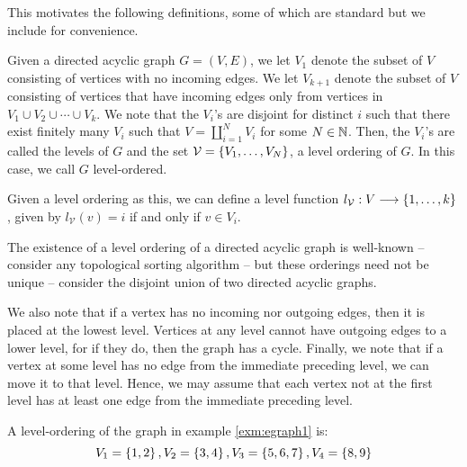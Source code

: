 \documentclass[./Thick_TQFTs_and_Quantum_Information.tex]{subfiles}
\begin{document}
This motivates the following definitions, some of which are standard but we
include for convenience.

\begin{defn}
Given a directed acyclic graph $G = (V, E)$, we let $V_1$ denote the subset of
$V$ consisting of vertices with no incoming edges. We let $V_{k + 1}$ denote the
subset of $V$ consisting of vertices that have incoming edges only from vertices
in $V_{1} \cup V_{2} \cup \cdots \cup V_{k}$. We note that the $V_i$'s are
disjoint for distinct $i$ such that there exist finitely many $V_i$
such that $V = \coprod_{i = 1}^{N} V_i$ for some $N \in \mathbb{N}$. Then, the $V_i$'s
are called the levels of $G$ and the set $\mathcal{V} = \set{V_1, \dots, V_N}$,
a level ordering of $G$. In this case, we call $G$ level-ordered.

Given a level ordering as this, we can define a level
function $l_{\mathcal{V}} : V \to \set{1, \dots, k}$, given by
$l_{\mathcal{V}}(v) = i$ if and only if $v \in V_i$.
\end{defn}

\begin{rmk}
The existence of a level ordering of a directed acyclic graph is well-known --
consider any topological sorting algorithm -- but these orderings need not be
unique -- consider the disjoint union of two directed acyclic graphs.
\end{rmk}

\begin{rmk}\label{rmk:lgraph_edge}
We also note that if a vertex has no incoming nor outgoing edges, then it is
placed at the lowest level. Vertices at any level cannot have outgoing edges to
a lower level, for if they do, then the graph has a cycle. Finally, we note that
if a vertex at some level has no edge from the immediate preceding level, we can
move it to that level. Hence, we may assume that each vertex not at the first
level has at least one edge from the immediate preceding level.
\end{rmk}

\begin{exm}
A level-ordering of the graph in example \ref{exm:egraph1} is:
\[
  V_1 = \set{1, 2}, V_2 = \set{3, 4}, V_3 = \set{5, 6, 7}, V_4 = \set{8, 9}
\]
\end{exm}
\end{document}
